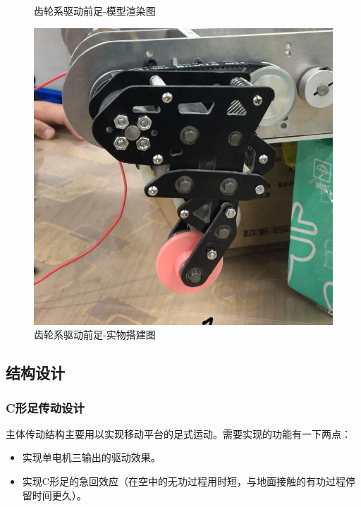 \documentclass[12pt]{article}
\begin{document}
\begin{CJK}{UTF8}{song}
\begin{figure}[H]
\caption{齿轮系驱动前足-模型渲染图}
\end{figure}
\begin{figure}[H]
\centering
\includegraphics[width=.6\textwidth]{chap2//figb.jpg}
\caption{齿轮系驱动前足-实物搭建图}
\end{figure}

\subsection{结构设计}
\subsubsection{C形足传动设计}
主体传动结构主要用以实现移动平台的足式运动。需要实现的功能有一下两点：\par
\begin{itemize}
\item 实现单电机三输出的驱动效果。
\item 实现C形足的急回效应（在空中的无功过程用时短，与地面接触的有功过程停留时间更久）。
\end{itemize}


\end{CJK}
\end{document}
